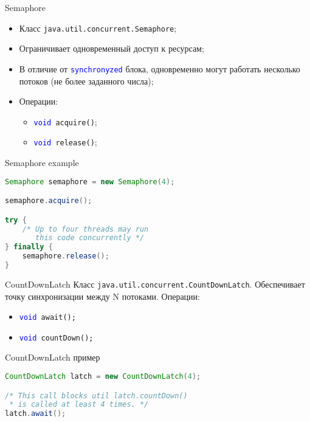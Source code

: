 \begin{frame}{Semaphore}
\begin{itemize}
    \item Класс \texttt{java.util.concurrent.Semaphore};
    \item Ограничивает одновременный доступ к ресурсам;
    \item В отличие от \textcolor{blue}{\texttt{synchronyzed}} блока, одновременно могут работать несколько потоков (не более заданного числа);
    \item Операции:
    \begin{itemize}
        \item \texttt{\textcolor{blue}{void} acquire()};
        \item \texttt{\textcolor{blue}{void} release()};
    \end{itemize}
\end{itemize}
\end{frame}

\begin{frame}[fragile]{Semaphore example}
\begin{lstlisting}[language=Java]
Semaphore semaphore = new Semaphore(4);

semaphore.acquire();

try {
    /* Up to four threads may run
       this code concurrently */
} finally {
    semaphore.release();
}
\end{lstlisting}
\end{frame}

\begin{frame}{CountDownLatch}
Класс \texttt{java.util.concurrent.CountDownLatch}.
\vfill
Обеспечивает точку синхронизации между N потоками.
\vfill
Операции:
\begin{itemize}
    \item \texttt{\textcolor{blue}{void} await();}
    \item \texttt{\textcolor{blue}{void} countDown();}
\end{itemize}
\end{frame}

\begin{frame}[fragile]{CountDownLatch пример}
\begin{lstlisting}[language=Java]
CountDownLatch latch = new CountDownLatch(4);

/* This call blocks util latch.countDown()
 * is called at least 4 times. */
latch.await();
\end{lstlisting}
\end{frame}

